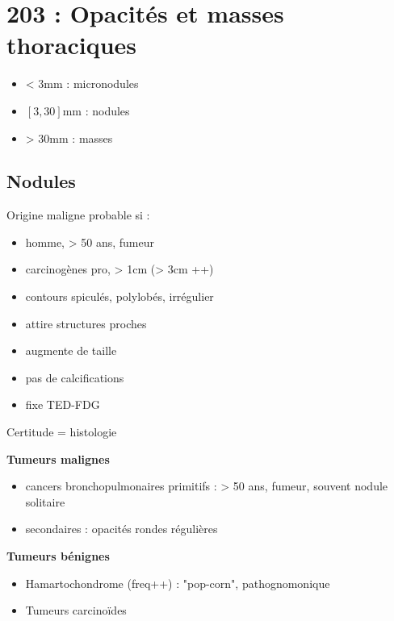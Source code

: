 \documentclass{article}
\begin{document}
\section{203 : Opacités et masses thoraciques}%
\label{sec:203_opacites_et_masses_thoraciques}

\begin{itemize}
  \item < 3mm : micronodules
  \item $[3,30]$mm : nodules
  \item > 30mm : masses
\end{itemize}

\subsection{Nodules}
Origine maligne probable si :
\begin{itemize}
  \item homme, > 50 ans, fumeur
  \item carcinogènes pro, > 1cm (> 3cm ++)
  \item contours spiculés, polylobés, irrégulier
  \item attire structures proches
  \item augmente de taille
  \item pas de calcifications
  \item fixe TED-FDG
\end{itemize}
Certitude = histologie

\textbf{Tumeurs malignes}  
\begin{itemize}
  \item cancers bronchopulmonaires primitifs : > 50 ans, fumeur, souvent nodule
    solitaire
  \item secondaires : opacités rondes régulières
\end{itemize}

\textbf{Tumeurs bénignes} 
\begin{itemize}
  \item Hamartochondrome (freq++) : "pop-corn", pathognomonique
  \item Tumeurs  carcinoïdes
\end{itemize}
\end{document}
